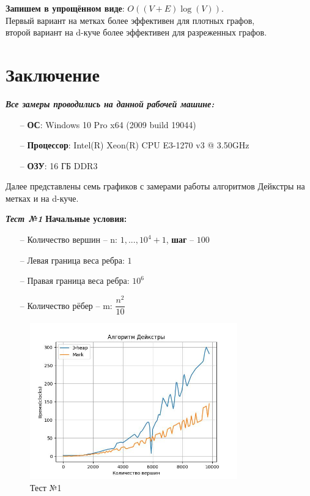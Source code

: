 \begin{text}
\textbf{Запишем в упрощённом виде}: $O((V + E)\log(V))$.\\

Первый вариант на метках более эффективен для плотных графов,\\
второй вариант на d-куче более эффективен для разреженных графов.
\newpage

\section{Заключение}
\textbf{\textit{Все замеры проводились на данной рабочей машине:}}
\begin{enumerate}
	\item[--] \textbf{ОС}: Windows 10 Pro x64 (2009 build 19044)
	\item[--] \textbf{Процессор}: Intel(R) Xeon(R) CPU E3-1270 v3 @ 3.50GHz
	\item[--] \textbf{ОЗУ}: 16 ГБ DDR3
\end{enumerate}

Далее представлены семь графиков с замерами работы алгоритмов Дейкстры на метках и на d-куче.\\

\begin{center}
\textbf{\textit{Тест №1}}
\textbf{Начальные условия:}

\begin{enumerate}
	\item[--] Количество вершин -- n: $1,...,10^4 + 1$, \textbf{шаг} -- $100$
	\item[--] Левая граница веса ребра: $1$
	\item[--] Правая граница веса ребра: $10^6$
	\item[--] Количество рёбер -- m: $\dfrac{n^2}{10}$ 
\end{enumerate}

\end{center}
\begin{figure}[h]
  \centering
  \includegraphics[width=0.8\textwidth]{pictures/1.jpeg}
  \caption{Тест №1}
  \label{fig:pict_1}
\end{figure}


\end{text}
